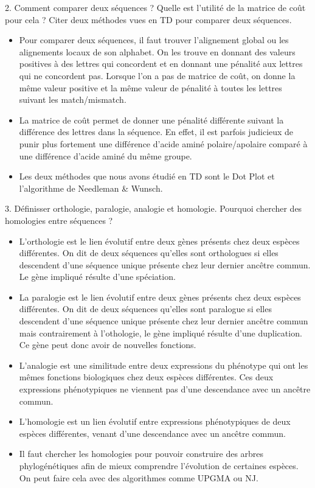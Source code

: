 \documentclass[
	12pt, %
]{fphw}
\begin{document}
\begin{problem}
	2. Comment comparer deux séquences ? Quelle est l'utilité de la matrice de coût pour cela ? Citer deux méthodes vues en TD pour comparer deux séquences.
\end{problem}
\begin{center}
	\begin{itemize}
		\item Pour comparer deux séquences, il faut trouver l'alignement global ou les alignements locaux de son alphabet. On les trouve en donnant des valeurs positives à des lettres qui concordent et en donnant une pénalité aux lettres qui ne concordent pas. Lorsque l'on a pas de matrice de coût, on donne la même valeur positive et la même valeur de pénalité à toutes les lettres suivant les match/mismatch.
		\item La matrice de coût permet de donner une pénalité différente suivant la différence des lettres dans la séquence. En effet, il est parfois judicieux de punir plus fortement une différence d'acide aminé polaire/apolaire comparé à une différence d'acide aminé du même groupe.
		\item Les deux méthodes que nous avons étudié en TD sont le Dot Plot et l'algorithme de Needleman \& Wunsch.
	\end{itemize}
\end{center}

\begin{problem}
	3. Définisser orthologie, paralogie, analogie et homologie. Pourquoi chercher des homologies entre séquences ?
\end{problem}
\begin{center}
	\begin{itemize}
		\item L'orthologie est le lien évolutif entre deux gènes présents chez deux espèces différentes. On dit de deux séquences qu'elles sont orthologues si elles descendent d'une séquence unique présente chez leur dernier ancêtre commun. Le gène impliqué résulte d'une spéciation.
		\item La paralogie est le lien évolutif entre deux gènes présents chez deux espèces différentes. On dit de deux séquences qu'elles sont paralogue si elles descendent d'une séquence unique présente chez leur dernier ancêtre commun mais contrairement à l'othologie, le gène impliqué résulte d'une duplication. Ce gène peut donc avoir de nouvelles fonctions.
		\item L'analogie est une similitude entre deux expressions du phénotype qui ont les mêmes fonctions biologiques chez deux espèces différentes. Ces deux expressions phénotypiques ne viennent pas d'une descendance avec un ancêtre commun.
		\item L'homologie est un lien évolutif entre expressions phénotypiques de deux espèces différentes, venant d'une descendance avec un ancêtre commun.
		\item Il faut chercher les homologies pour pouvoir construire des arbres phylogénétiques afin de mieux comprendre l'évolution de certaines espèces. On peut faire cela avec des algorithmes comme UPGMA ou NJ.
	\end{itemize}
\end{center}
\end{document}
